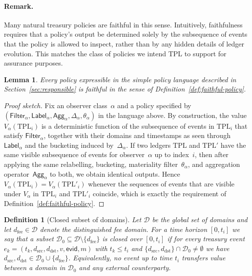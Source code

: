 \documentclass[11pt]{article}
\newtheorem{definition}{Definition}
\newtheorem{lemma}{Lemma}
\begin{document}
\paragraph{Remark.}
Many natural treasury policies are faithful in this sense.
Intuitively, faithfulness requires that a policy's output be determined solely by the subsequence of events that the policy is
allowed to inspect, rather than by any hidden details of ledger evolution.
This matches the class of policies we intend TPL to support for assurance purposes.

\begin{lemma}
\label{lem:policy-language-faithful}
Every policy expressible in the simple policy language described in Section~\ref{sec:responsible} is faithful in the sense of Definition~\ref{def:faithful-policy}.
\end{lemma}

\begin{proof}[Proof sketch]
Fix an observer class~$\alpha$ and a policy specified by $(\mathsf{Filter}_\alpha,\mathsf{Label}_\alpha,\mathsf{Agg}_\alpha,\Delta_\alpha,\theta_\alpha)$ in the language above.
By construction, the value $V_\alpha(\mathrm{TPL}_i)$ is a deterministic function of the subsequence of events in $\mathrm{TPL}_i$ that satisfy $\mathsf{Filter}_\alpha$, together with their domains and timestamps as seen through $\mathsf{Label}_\alpha$ and the bucketing induced by~$\Delta_\alpha$.
If two ledgers $\mathrm{TPL}$ and $\mathrm{TPL}'$ have the same visible subsequence of events for observer~$\alpha$ up to index~$i$, then after applying the same relabelling, bucketing, materiality filter~$\theta_\alpha$, and aggregation operator~$\mathsf{Agg}_\alpha$ to both, we obtain identical outputs.
Hence $V_\alpha(\mathrm{TPL}_i) = V_\alpha(\mathrm{TPL}'_i)$ whenever the sequences of events that are visible under $V_\alpha$ in $\mathrm{TPL}_i$ and $\mathrm{TPL}'_i$ coincide, which is exactly the requirement of Definition~\ref{def:faithful-policy}.
\end{proof}

\begin{definition}[Closed subset of domains]
\label{def:closed-domains}
Let $\mathcal{D}$ be the global set of domains and let $d_{\mathrm{fee}} \in \mathcal{D}$ denote the distinguished fee domain.
For a time horizon $[0,t_i]$ we say that a subset $\mathcal{D}_0 \subseteq \mathcal{D} \setminus \{d_{\mathrm{fee}}\}$ is \emph{closed over $[0,t_i]$}
if for every treasury event $e_k = (t_k,d_{\mathrm{src}},d_{\mathrm{dst}},v,\mathsf{evid},m)$ with $t_k \le t_i$ and
$\{d_{\mathrm{src}},d_{\mathrm{dst}}\} \cap \mathcal{D}_0 \neq \emptyset$ we have
$d_{\mathrm{src}},d_{\mathrm{dst}} \in \mathcal{D}_0 \cup \{d_{\mathrm{fee}}\}$.
Equivalently, no event up to time $t_i$ transfers value between a domain in $\mathcal{D}_0$ and any external counterparty.
\end{definition}
\end{document}
